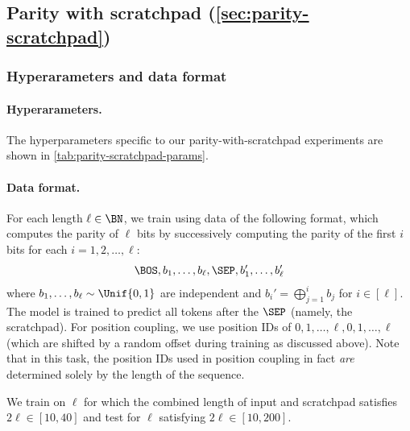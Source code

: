 \documentclass{article}
\begin{document}
\subsection{Parity with scratchpad (\cref{sec:parity-scratchpad})}
\subsubsection{Hyperarameters and data format}
\label{sec:parity-scratchpad-data-format}

\paragraph{Hyperarameters.} The hyperparameters specific to our parity-with-scratchpad experiments are shown in \cref{tab:parity-scratchpad-params}.

\paragraph{Data format.}  For each length $\ell \in \BN$, we train using data of the following format, which computes the parity of $\ell$ bits by successively computing the parity of the first $i$ bits for each $i = 1, 2, \ldots, \ell$: 
\begin{align}
\BOS, b_1, \ldots, b_\ell, \SEP, b_1', \ldots, b_\ell'\label{eq:parity-cot}
\end{align}
where $b_1, \ldots, b_\ell \sim \Unif\{0,1\}$ are independent and $b_i' = \bigoplus_{j=1}^i b_j$ for $i \in [\ell]$. The model is trained to predict all tokens after the $\SEP$ (namely, the scratchpad). For position coupling, we use position IDs of $0, 1, \ldots, \ell, 0, 1, \ldots, \ell$ (which are shifted by a random offset during training as discussed above).  Note that in this task, the position IDs used in position coupling in fact \emph{are} determined solely by the length of the sequence. 
 
We train on $\ell$ for which the combined length of input and scratchpad satisfies $2\ell \in {[10, 40]}$ and test for $\ell$ satisfying $2\ell \in {[10, 200]}$.
\end{document}
